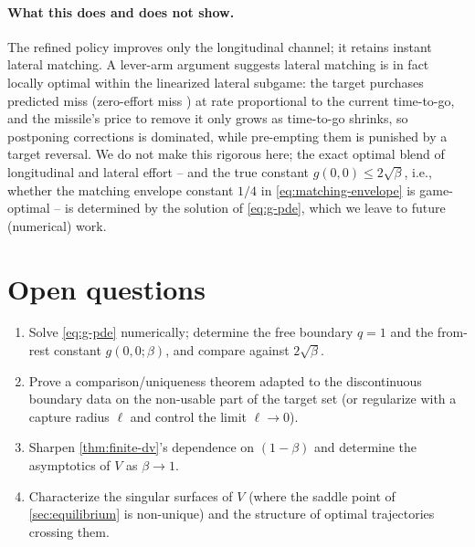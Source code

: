\documentclass{article}
\theoremstyle{remark}
\begin{document}
\paragraph{What this does and does not show.}
The refined policy improves only the longitudinal channel; it retains
instant lateral matching.  A lever-arm argument suggests lateral matching is
in fact locally optimal within the linearized lateral subgame: the target
purchases predicted miss (zero-effort miss \cite{zarchan2012}) at rate
proportional to the current time-to-go, and the missile's price to remove it
only grows as time-to-go shrinks, so postponing corrections is dominated,
while pre-empting them is punished by a target reversal.  We do not make this
rigorous here; the exact optimal blend of longitudinal and lateral effort --
and the true constant $g(0,0) \le 2\sqrt\beta$, i.e., whether the matching
envelope constant $1/4$ in \cref{eq:matching-envelope} is game-optimal -- is
determined by the solution of \cref{eq:g-pde}, which we leave to future
(numerical) work.

\section{Open questions}

\begin{enumerate}
\item Solve \cref{eq:g-pde} numerically; determine the free boundary $q = 1$
  and the from-rest constant $g(0,0;\beta)$, and compare against
  $2\sqrt\beta$.
\item Prove a comparison/uniqueness theorem adapted to the discontinuous
  boundary data on the non-usable part of the target set (or regularize with a
  capture radius $\ell$ and control the limit $\ell \to 0$).
\item Sharpen \cref{thm:finite-dv}'s dependence on $(1-\beta)$ and determine
  the asymptotics of $V$ as $\beta \to 1$.
\item Characterize the singular surfaces of $V$ (where the saddle point of
  \cref{sec:equilibrium} is non-unique) and the structure of optimal
  trajectories crossing them.
\end{enumerate}




\end{document}
